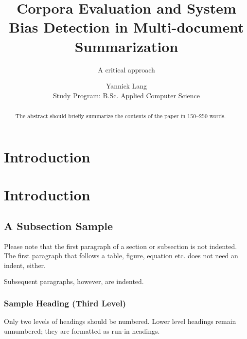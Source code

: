 \documentclass[runningheads]{llncs}
\begin{document}
\title{Corpora Evaluation and System Bias Detection in Multi-document Summarization}
\subtitle{A critical approach}

%
%

\author{Yannick Lang \\
    \small Study Program: B.Sc. Applied Computer Science }


%
\maketitle              %
%
\begin{abstract}
    The abstract should briefly summarize the contents of the paper in
    150--250 words.
    
\end{abstract}
%
%
%

\section{Introduction}
\label{sec:introcution}


\section{Introduction}
\subsection{A Subsection Sample}
Please note that the first   paragraph of a section or subsection is
not indented. The first paragraph that follows a table, figure,
equation etc. does not need an indent, either.

Subsequent paragraphs, however, are indented.\cite{Poisonin18:online}

\subsubsection{Sample Heading (Third Level)} Only two levels of
headings should be numbered. Lower level headings remain unnumbered;
they are formatted as run-in headings.



\end{document}
